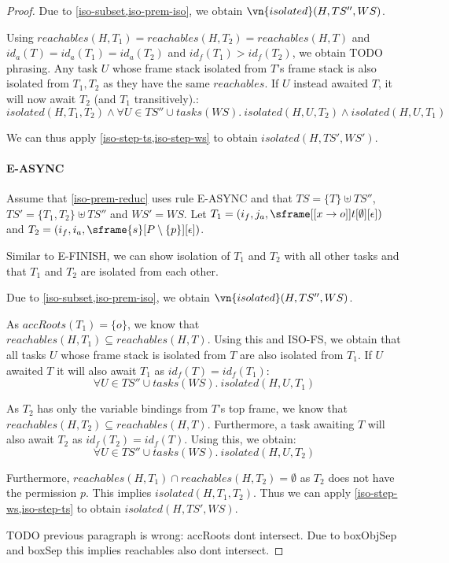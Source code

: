 \begin{proof}
Due to \cref{iso-subset,iso-prem-iso}, we obtain $\vn{isolated}(H, TS'', WS)$.

Using $reachables(H, T_1) = reachables(H, T_2) = reachables(H, T)$ and $id_a(T) = id_a(T_1) = id_a(T_2)$ and $id_f(T_1) > id_f(T_2)$, we obtain TODO phrasing. Any task $U$ whose frame stack isolated from $T$'s frame stack is also isolated from $T_1, T_2$ as they have the same $reachables$. If $U$ instead awaited $T$, it will now await $T_2$ (and $T_1$ transitively).:
\[
    isolated(H, T_1, T_2) \wedge \forall U \in TS'' \cup tasks(WS).\ isolated(H, U, T_2) \wedge isolated(H, U, T_1)
\]

We can thus apply \cref{iso-step-ts,iso-step-ws} to obtain $isolated(H, TS', WS')$.

\paragraph{E-ASYNC}
Assume that \cref{iso-prem-reduc} uses rule E-ASYNC and that $TS = \{ T \} \uplus TS''$, $TS' = \{ T_1, T_2 \} \uplus TS''$ and $WS' = WS$. Let $T_1 = (i_f, j_a, \sframe[[x \rightarrow o]]{t}[\emptyset][\epsilon])$ and $T_2 = (i_f, i_a, \sframe{s}[P\setminus \{p\}][\epsilon])$.

Similar to E-FINISH, we can show isolation of $T_1$ and $T_2$ with all other tasks and that $T_1$ and $T_2$ are isolated from each other.

Due to \cref{iso-subset,iso-prem-iso}, we obtain $\vn{isolated}(H, TS'', WS)$.

As $accRoots(T_1) = \{o\}$, we know that $reachables(H, T_1) \subseteq reachables(H, T)$. Using this and ISO-FS, we obtain that all tasks $U$ whose frame stack is isolated from $T$ are also isolated from $T_1$. If $U$ awaited $T$ it will also await $T_1$ as $id_f(T) = id_f(T_1)$:
\[
    \forall U \in TS'' \cup tasks(WS).\ isolated(H, U, T_1)
\]

As $T_2$ has only the variable bindings from $T$'s top frame, we know that $reachables(H, T_2) \subseteq reachables(H, T)$. Furthermore, a task awaiting $T$ will also await $T_2$ as $id_f(T_2) = id_f(T)$. Using this, we obtain:
\[
    \forall U \in TS'' \cup tasks(WS).\ isolated(H, U, T_2)
\]

Furthermore, $reachables(H, T_1) \cap reachables(H, T_2) = \emptyset$ as $T_2$ does not have the permission $p$. This implies $isolated(H, T_1, T_2)$. Thus we can apply \cref{iso-step-ws,iso-step-ts} to obtain $isolated(H, TS', WS)$.

TODO previous paragraph is wrong: accRoots dont intersect. Due to boxObjSep and boxSep this implies reachables also dont intersect.


\end{proof}
